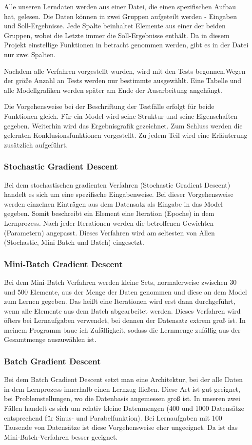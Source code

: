 Alle unseren Lerndaten werden aus einer Datei, die einen spezifischen Aufbau hat, gelesen. Die Daten können in zwei Gruppen aufgeteilt werden - Eingaben und Soll-Ergebnisse. Jede Spalte beinhaltet Elemente aus einer der beiden Gruppen, wobei die Letzte immer die Soll-Ergebnisse enthält. Da in diesem Projekt einstellige Funktionen in betracht genommen werden, gibt es in der Datei nur zwei Spalten.

Nachdem alle Verfahren vorgestellt wurden, wird mit den Tests begonnen.Wegen der größe Anzahl an Tests werden nur bestimmte ausgewählt. Eine Tabelle und alle Modellgrafiken werden später am Ende der Ausarbeitung angehängt. 

Die Vorgehensweise bei der Beschriftung der Testfälle erfolgt für beide Funktionen gleich. Für ein Model wird seine Struktur und seine Eigenschaften gegeben. Weiterhin wird das Ergebnisgrafik gezeichnet. Zum Schluss werden die gelernten Konklusionsfunktionen vorgestellt. Zu jedem Teil wird eine Erläuterung zusätzlich aufgeführt. 
 
\subsubsection{Stochastic Gradient Descent}
Bei dem stochastischen gradienten Verfahren (Stochastic Gradient Descent) handelt es sich um eine spezifische Eingabenweise. Bei dieser Vorgehensweise werden einzelnen Einträgen aus dem Datensatz als Eingabe in das Model gegeben. Somit beschreibt ein Element eine Iteration (Epoche) in dem Lernprozess. Nach jeder Iterationen werden die betroffenen Gewichten (Parametern) angepasst. Dieses Verfahren wird am seltesten von Allen (Stochastic, Mini-Batch und Batch) eingesetzt.


\subsubsection{Mini-Batch Gradient Descent} \label{mini_batch}
Bei dem Mini-Batch Verfahren werden kleine Sets, normalerweise zwischen 30 und 500 Elemente, aus der Menge der Daten genommen und diese an dem Model zum Lernen gegeben. Das heißt eine Iterationen wird erst dann durchgeführt, wenn alle Elemente aus dem Batch abgearbeitet werden. Dieses Verfahren wird öfters bei Lernaufgaben verwendet, bei dennen der Datensatz extrem groß ist. In meinem Programm baue ich Zufälligkeit, sodass die Lernmenge zufällig aus der Gesamtmenge auszuwählen ist.

\subsubsection{Batch Gradient Descent}
Bei dem Batch Gradient Descent setzt man eine Architektur, bei der alle Daten in dem Lernprozess innerhalb einen Lernzug fließen. Diese Art ist gut geeignet, bei Problemstellungen, wo die Datenbasis angemessen groß ist. In unseren zwei Fällen handelt es sich um relativ kleine Datenmengen (400 und 1000 Datensätze entsprechend für Sinus- und Parabelfunktion). Bei Lernaufgaben mit 100 Tausende von Datensätze ist diese Vorgehensweise eher ungeeignet. Da ist das Mini-Batch-Verfahren besser geeignet.

